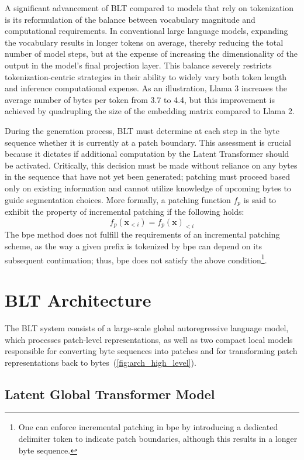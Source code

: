 A significant advancement of {\textsc BLT} compared to models that rely on tokenization is its reformulation of the balance between vocabulary magnitude and computational requirements. In conventional large language models, expanding the vocabulary results in longer tokens on average, thereby reducing the total number of model steps, but at the expense of increasing the dimensionality of the output in the model's final projection layer. This balance severely restricts tokenization-centric strategies in their ability to widely vary both token length and inference computational expense. As an illustration, Llama 3 increases the average number of bytes per token from 3.7 to 4.4, but this improvement is achieved by quadrupling the size of the embedding matrix compared to Llama 2.

During the generation process, {\textsc BLT} must determine at each step in the byte sequence whether it is currently at a patch boundary. This assessment is crucial because it dictates if additional computation by the Latent Transformer should be activated. Critically, this decision must be made without reliance on any bytes in the sequence that have not yet been generated; patching must proceed based only on existing information and cannot utilize knowledge of upcoming bytes to guide segmentation choices. More formally, a patching function $f_p$ is said to exhibit the property of incremental patching if the following holds:
$$f_p(\pmb{x}_{<i}) = f_p(\pmb{x})_{<i}$$
The bpe method does not fulfill the requirements of an incremental patching scheme, as the way a given prefix is tokenized by bpe can depend on its subsequent continuation; thus, bpe does not satisfy the above condition\footnote{One can enforce incremental patching in bpe by introducing a dedicated delimiter token to indicate patch boundaries, although this results in a longer byte sequence.}.

\section{{\textsc BLT} Architecture}
\label{section:architecture}
The {\textsc BLT} system consists of a large-scale global autoregressive language model, which processes patch-level representations, as well as two compact local models responsible for converting byte sequences into patches and for transforming patch representations back to bytes~(\autoref{fig:arch_high_level}).

\subsection{Latent Global Transformer Model}

